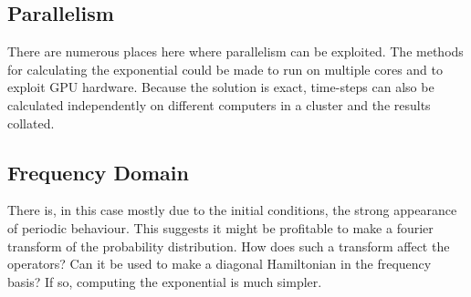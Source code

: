 \documentclass{amsart}
\begin{document}
\subsection*{Parallelism}
There are numerous places here where parallelism can be exploited. The
methods for calculating the exponential could be made to run on
multiple cores and to exploit GPU hardware. Because the solution is
exact, time-steps can also be calculated independently on different
computers in a cluster and the results collated.

\subsection*{Frequency Domain}
There is, in this case mostly due to the initial conditions, the
strong appearance of periodic behaviour. This suggests it might be
profitable to make a fourier transform of the probability
distribution. How does such a transform affect the operators? Can it
be used to make a diagonal Hamiltonian in the frequency basis? If so,
computing the exponential is much simpler.
\end{document}
